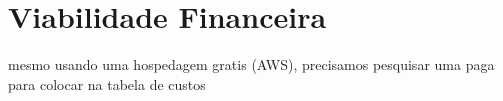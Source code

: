 \chapter{Viabilidade Financeira}

mesmo usando uma hospedagem gratis (AWS), precisamos pesquisar uma paga para colocar na tabela de custos





